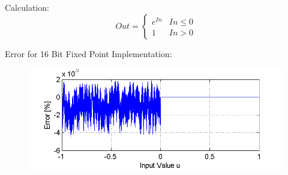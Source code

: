 Calculation:
\begin{equation*}
	Out = \begin{cases}e^{In} & In \le 0 \\ 1 & In > 0\end{cases}
\end{equation*}

Error for 16 Bit Fixed Point Implementation:
\begin{figure}[H]
	\includegraphics[width=\textwidth]{Exp_Error}
\end{figure}
